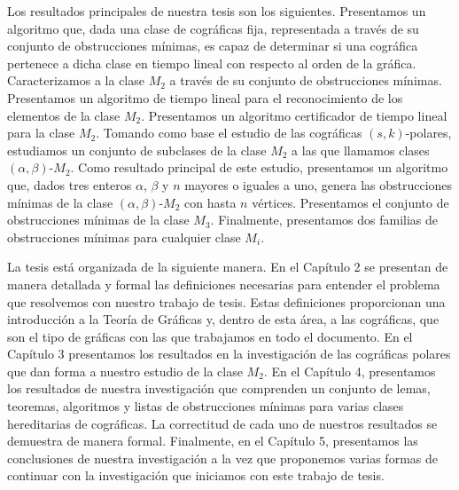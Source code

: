 Los resultados principales de nuestra tesis son los siguientes. Presentamos un algoritmo que, dada una clase de cográficas fija, representada a través de su conjunto de obstrucciones mínimas, es capaz de determinar si una cográfica pertenece a dicha clase en tiempo lineal con respecto al orden de la gráfica. Caracterizamos a la clase $M_2$ a través de su conjunto de obstrucciones mínimas. Presentamos un algoritmo de tiempo lineal para el reconocimiento de los elementos de la clase $M_2$. Presentamos un algoritmo certificador de tiempo lineal para la clase $M_2$. Tomando como base el estudio de las cográficas $(s,k)$-polares, estudiamos un conjunto de subclases de la clase $M_2$ a las que llamamos clases $(\alpha,\beta)$-$M_2$. Como resultado principal de este estudio, presentamos un algoritmo que, dados tres enteros $\alpha$, $\beta$ y $n$ mayores o iguales a uno, genera las obstrucciones mínimas de la clase $(\alpha,\beta)$-$M_2$ con hasta $n$ vértices. Presentamos el conjunto de obstrucciones mínimas de la clase $M_3$. Finalmente, presentamos dos familias de obstrucciones mínimas para cualquier clase $M_i$.

La tesis está organizada de la siguiente manera. En el Capítulo 2 se presentan de manera detallada y formal las definiciones necesarias para entender el problema que resolvemos con nuestro trabajo de tesis. Estas definiciones proporcionan una introducción a la Teoría de Gráficas y, dentro de esta área, a las cográficas, que son el tipo de gráficas con las que trabajamos en todo el documento. En el Capítulo 3 presentamos los resultados en la investigación de las cográficas polares que dan forma a nuestro estudio de la clase $M_2$. En el Capítulo 4, presentamos los resultados de nuestra investigación que comprenden un conjunto de lemas, teoremas, algoritmos y listas de obstrucciones mínimas para varias clases hereditarias de cográficas. La correctitud de cada uno de nuestros resultados se demuestra de manera formal. Finalmente, en el Capítulo 5, presentamos las conclusiones de nuestra investigación a la vez que proponemos varias formas de continuar con la investigación que iniciamos con este trabajo de tesis.
